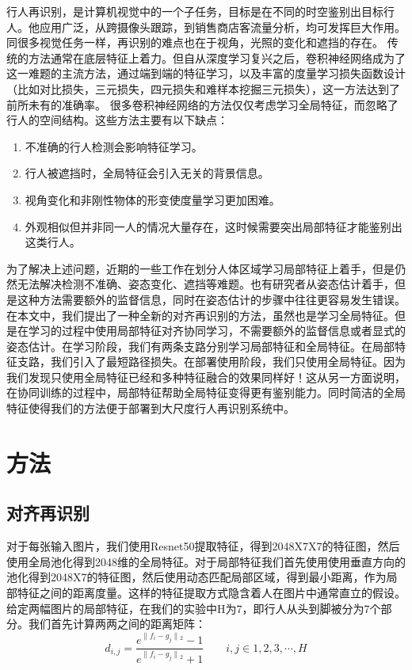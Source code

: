 行人再识别，是计算机视觉中的一个子任务，目标是在不同的时空鉴别出目标行人。他应用广泛，从跨摄像头跟踪，到销售商店客流量分析，均可发挥巨大作用。同很多视觉任务一样，再识别的难点也在于视角，光照的变化和遮挡的存在。
传统的方法通常在底层特征上着力。但自从深度学习复兴之后，卷积神经网络成为了这一难题的主流方法，通过端到端的特征学习，以及丰富的度量学习损失函数设计（比如对比损失，三元损失，四元损失和难样本挖掘三元损失），这一方法达到了前所未有的准确率。
很多卷积神经网络的方法仅仅考虑学习全局特征，而忽略了行人的空间结构。这些方法主要有以下缺点：
\begin{enumerate}
\item 不准确的行人检测会影响特征学习。
\item 行人被遮挡时，全局特征会引入无关的背景信息。
\item 视角变化和非刚性物体的形变使度量学习更加困难。
\item 外观相似但并非同一人的情况大量存在，这时候需要突出局部特征才能鉴别出这类行人。
\end{enumerate}
为了解决上述问题，近期的一些工作在划分人体区域学习局部特征上着手，但是仍然无法解决检测不准确、姿态变化、遮挡等难题。也有研究者从姿态估计着手，但是这种方法需要额外的监督信息，同时在姿态估计的步骤中往往更容易发生错误。
在本文中，我们提出了一种全新的对齐再识别的方法，虽然也是学习全局特征。但是在学习的过程中使用局部特征对齐协同学习，不需要额外的监督信息或者显式的姿态估计。在学习阶段，我们有两条支路分别学习局部特征和全局特征。在局部特征支路，我们引入了最短路径损失。在部署使用阶段，我们只使用全局特征。因为我们发现只使用全局特征已经和多种特征融合的效果同样好！这从另一方面说明，在协同训练的过程中，局部特征帮助全局特征变得更有鉴别能力。同时简洁的全局特征使得我们的方法便于部署到大尺度行人再识别系统中。

\section{方法} 

\subsection{对齐再识别} 

对于每张输入图片，我们使用Resnet50提取特征，得到2048X7X7的特征图，然后使用全局池化得到2048维的全局特征。对于局部特征我们首先使用使用垂直方向的池化得到2048X7的特征图，然后使用动态匹配局部区域，得到最小距离，作为局部特征之间的距离度量。这样的特征提取方式隐含着人在图片中通常直立的假设。
给定两幅图片的局部特征，在我们的实验中H为7，即行人从头到脚被分为7个部分。我们首先计算两两之间的距离矩阵：
\begin{equation} {d_{i,j}} = \frac{{{e^{\|{f_i} - {g_j}\|{_2}}} - 1}}{{{e^{\|{f_i} - {g_j}\|{_2}}} + 1}}\qquad i,j \in 1,2,3, \cdots ,H \end{equation}

